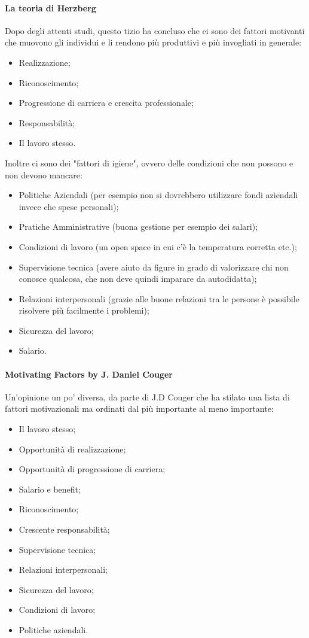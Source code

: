 \paragraph{La teoria di Herzberg}
Dopo degli attenti studi, questo tizio ha concluso che ci sono dei fattori motivanti che muovono gli individui e li rendono più produttivi e più invogliati in generale:
\begin{itemize}
	\item Realizzazione;
	\item Riconoscimento;
	\item Progressione di carriera e crescita professionale;
	\item Responsabilità;
	\item Il lavoro stesso.
\end{itemize}
Inoltre ci sono dei "fattori di igiene", ovvero delle condizioni che non possono e non devono mancare:
\begin{itemize}
	\item Politiche Aziendali (per esempio non si dovrebbero utilizzare fondi aziendali invece che spese personali);
	\item Pratiche Amministrative (buona gestione per esempio dei salari);
	\item Condizioni di lavoro (un open space in cui c'è la temperatura corretta etc.);
	\item Supervisione tecnica (avere aiuto da figure in grado di valorizzare chi non conosce qualcosa, che non deve quindi imparare da autodidatta);
	\item Relazioni interpersonali (grazie alle buone relazioni tra le persone è possibile risolvere più facilmente i problemi);
	\item Sicurezza del lavoro;
	\item Salario.
\end{itemize}
\paragraph{Motivating Factors by J. Daniel Couger}
Un'opinione un po' diversa, da parte di J.D Couger che ha stilato una lista di fattori motivazionali ma ordinati dal più importante al meno importante:
\begin{itemize}
	\item Il lavoro stesso;
	\item Opportunità di realizzazione;
	\item Opportunità di progressione di carriera;
	\item Salario e benefit;
	\item Riconoscimento;
	\item Crescente responsabilità;
	\item Supervisione tecnica;
	\item Relazioni interpersonali;
	\item Sicurezza del lavoro;
	\item Condizioni di lavoro;
	\item Politiche aziendali.
\end{itemize}
